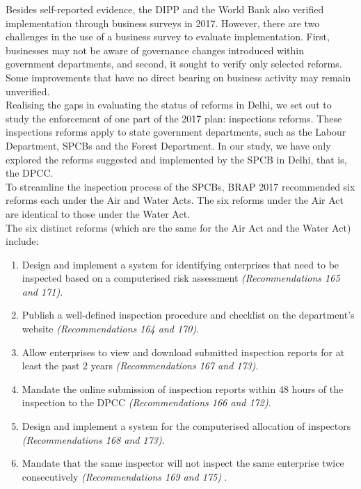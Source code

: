 \documentclass[a4paper, 12pt, twoside]{article}
\begin{document}
                 Besides self-reported evidence, the DIPP and the World Bank also verified implementation through business surveys in 2017. However, there are two challenges in the use of a business survey to evaluate implementation. First, businesses may not be aware of governance changes introduced within government departments, and second, it sought to verify only selected reforms. Some improvements that have no direct bearing on business activity may remain unverified. \\
                 
                 Realising the gaps in evaluating the status of reforms in Delhi, we set out to study the enforcement of one part of the 2017 plan: inspections reforms. These inspections reforms apply to state government departments, such as the Labour Department, SPCBs and the Forest Department. In our study, we have only explored the reforms suggested and implemented by the SPCB in Delhi, that is, the DPCC. \\
                 
                 To streamline the inspection process of the SPCBs, BRAP 2017 recommended six reforms each under the Air and Water Acts. The six reforms under the Air Act are identical to those under the Water Act. \\
                 
                 The six distinct reforms (which are the same for the Air Act and the Water Act) include: 
                 
                 \begin{enumerate}
                 \item Design and implement a system for identifying enterprises that need to be inspected based on a computerised risk assessment \textit{(Recommendations 165 and 171)}.
                 \item Publish a well-defined inspection procedure and checklist on the department’s website \textit{(Recommendations 164 and 170)}.
                 \item Allow enterprises to view and download submitted inspection reports for at least the past 2 years \textit{(Recommendations 167 and 173)}.
                 \item Mandate the online submission of inspection reports within 48 hours of the inspection to the DPCC \textit{(Recommendations 166 and 172)}.
                 \item Design and implement a system for the computerised allocation of inspectors \textit{(Recommendations 168 and 173)}.
                 \item Mandate that the same inspector will not inspect the same enterprise twice consecutively \textit{(Recommendations 169 and 175)} \parencite{DIPPa}.
                 \end{enumerate}
                 
\end{document}
